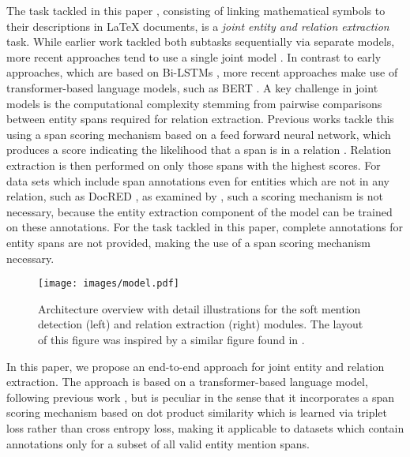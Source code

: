 \documentclass[11pt]{article}
\begin{document}
The task tackled in this paper \cite{lai-etal-2022-semeval}, consisting of linking mathematical symbols to their descriptions in LaTeX documents, is a \textit{joint entity and relation extraction} task.
While earlier work tackled both subtasks sequentially via separate models, more recent approaches tend to use a single joint model \cite{luan_multi-task_2018, bekoulis_joint_2018, nguyen_end--end_2019, eberts_end--end_2021}.
In contrast to early approaches, which are based on Bi-LSTMs \cite{luan_multi-task_2018, bekoulis_joint_2018, nguyen_end--end_2019}, more recent approaches \cite{wadden_entity_2019, eberts_end--end_2021} make use of transformer-based language models, such as BERT \cite{devlin_bert_2019}.
A key challenge in joint models is the computational complexity stemming from pairwise comparisons between entity spans required for relation extraction.
Previous works tackle this using a span scoring mechanism based on a feed forward neural network, which produces a score indicating the likelihood that a span is in a relation \cite{luan_multi-task_2018, wadden_entity_2019}.
Relation extraction is then performed on only those spans with the highest scores.
For data sets which include span annotations even for entities which are not in any relation, such as DocRED \cite{yao_docred_2019}, as examined by  \citet{eberts_end--end_2021}, such a scoring mechanism is not necessary, because the entity extraction component of the model can be trained on these annotations.
For the task tackled in this paper, complete annotations for entity spans are not provided, making the use of a span scoring mechanism necessary.

\begin{figure*}
    \centering
    \texttt{[image: images/model.pdf]}
    \caption{Architecture overview with detail illustrations for the soft mention detection (left) and relation extraction (right) modules. The layout of this figure was inspired by a similar figure found in \cite{eberts_end--end_2021}.}
    \label{fig:overview}
\end{figure*}

In this paper, we propose an end-to-end approach for joint entity and relation extraction. The approach is based on a transformer-based language model, following previous work \cite{DBLP:conf/ecai/EbertsU20, eberts_end--end_2021}, but is peculiar in the sense that it incorporates a span scoring mechanism based on dot product similarity which is learned via triplet loss rather than cross entropy loss, making it applicable to datasets which contain annotations only for a subset of all valid entity mention spans.
\end{document}
